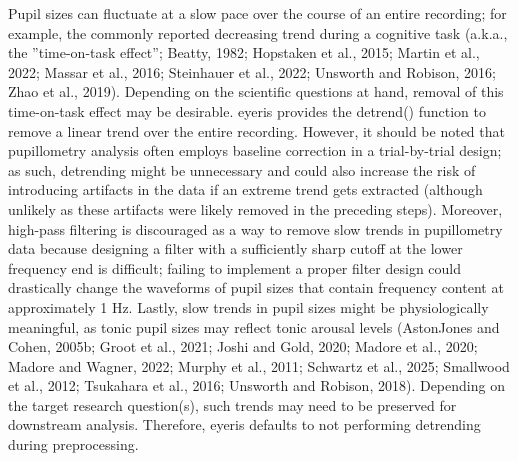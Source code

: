 Pupil sizes can fluctuate at a slow pace over the course of an entire recording; for example, the commonly reported decreasing trend during a cognitive task (a.k.a., the ”time-on-task effect”; Beatty, 1982; Hopstaken et al., 2015; Martin et al., 2022; Massar et al., 2016; Steinhauer et al., 2022; Unsworth and Robison, 2016; Zhao et al., 2019). Depending on the scientific questions at hand, removal of this time-on-task effect may be desirable. eyeris provides the detrend() function to remove a linear trend over the entire recording. However, it should be noted that pupillometry analysis often employs baseline correction in a trial-by-trial design; as such, detrending might be unnecessary and could also increase the risk of introducing artifacts in the data if an extreme trend gets extracted (although unlikely as these artifacts were likely removed in the preceding steps). Moreover, high-pass filtering is discouraged as a way to remove slow trends in pupillometry data because designing a filter with a sufficiently sharp cutoff at the lower frequency end is difficult; failing to implement a proper filter design could drastically change the waveforms of pupil sizes that contain frequency content at approximately 1 Hz. Lastly, slow trends in pupil sizes might be physiologically meaningful, as tonic pupil sizes may reflect tonic arousal levels (AstonJones and Cohen, 2005b; Groot et al., 2021; Joshi and Gold, 2020; Madore et al., 2020; Madore and Wagner, 2022; Murphy et al., 2011; Schwartz et al., 2025; Smallwood et al., 2012; Tsukahara et al., 2016; Unsworth and Robison, 2018). Depending on the target research question(s), such trends may need to be preserved for downstream analysis. Therefore, eyeris defaults to not performing detrending during preprocessing.

